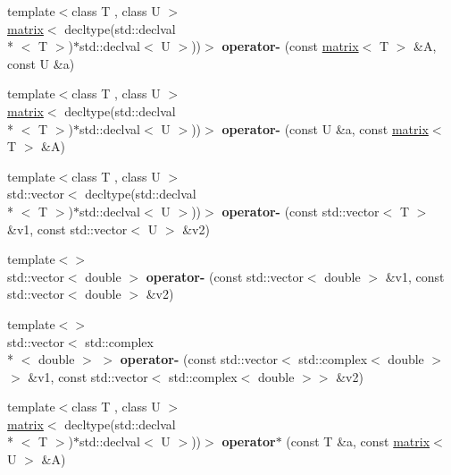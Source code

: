 \begin{DoxyCompactItemize}
\item 
\hypertarget{namespacekeycpp_a71a8f2ebc458f06e29b17ecc28ed000d}{{\footnotesize template$<$class T , class U $>$ }\\\hyperlink{classkeycpp_1_1matrix}{matrix}$<$ decltype(std\-::declval\\*
$<$ T $>$)$\ast$std\-::declval$<$ U $>$))$>$ {\bfseries operator-\/} (const \hyperlink{classkeycpp_1_1matrix}{matrix}$<$ T $>$ \&A, const U \&a)}\label{namespacekeycpp_a71a8f2ebc458f06e29b17ecc28ed000d}

\item 
\hypertarget{namespacekeycpp_a4bc853f9410d964ef9f163ce53ea4828}{{\footnotesize template$<$class T , class U $>$ }\\\hyperlink{classkeycpp_1_1matrix}{matrix}$<$ decltype(std\-::declval\\*
$<$ T $>$)$\ast$std\-::declval$<$ U $>$))$>$ {\bfseries operator-\/} (const U \&a, const \hyperlink{classkeycpp_1_1matrix}{matrix}$<$ T $>$ \&A)}\label{namespacekeycpp_a4bc853f9410d964ef9f163ce53ea4828}

\item 
\hypertarget{namespacekeycpp_ab185edce957f4afd65cb641ec6307376}{{\footnotesize template$<$class T , class U $>$ }\\std\-::vector$<$ decltype(std\-::declval\\*
$<$ T $>$)$\ast$std\-::declval$<$ U $>$))$>$ {\bfseries operator-\/} (const std\-::vector$<$ T $>$ \&v1, const std\-::vector$<$ U $>$ \&v2)}\label{namespacekeycpp_ab185edce957f4afd65cb641ec6307376}

\item 
\hypertarget{namespacekeycpp_aacbc330eb0eaccf5df2b35f425a15564}{{\footnotesize template$<$$>$ }\\std\-::vector$<$ double $>$ {\bfseries operator-\/} (const std\-::vector$<$ double $>$ \&v1, const std\-::vector$<$ double $>$ \&v2)}\label{namespacekeycpp_aacbc330eb0eaccf5df2b35f425a15564}

\item 
\hypertarget{namespacekeycpp_acadf89ed5e860edb0e17cc606c233a9a}{{\footnotesize template$<$$>$ }\\std\-::vector$<$ std\-::complex\\*
$<$ double $>$ $>$ {\bfseries operator-\/} (const std\-::vector$<$ std\-::complex$<$ double $>$$>$ \&v1, const std\-::vector$<$ std\-::complex$<$ double $>$$>$ \&v2)}\label{namespacekeycpp_acadf89ed5e860edb0e17cc606c233a9a}

\item 
\hypertarget{namespacekeycpp_a8d5dbf37b71d16d686dd0fdbad82f8fb}{{\footnotesize template$<$class T , class U $>$ }\\\hyperlink{classkeycpp_1_1matrix}{matrix}$<$ decltype(std\-::declval\\*
$<$ T $>$)$\ast$std\-::declval$<$ U $>$))$>$ {\bfseries operator$\ast$} (const T \&a, const \hyperlink{classkeycpp_1_1matrix}{matrix}$<$ U $>$ \&A)}\label{namespacekeycpp_a8d5dbf37b71d16d686dd0fdbad82f8fb}


\end{DoxyCompactItemize}

